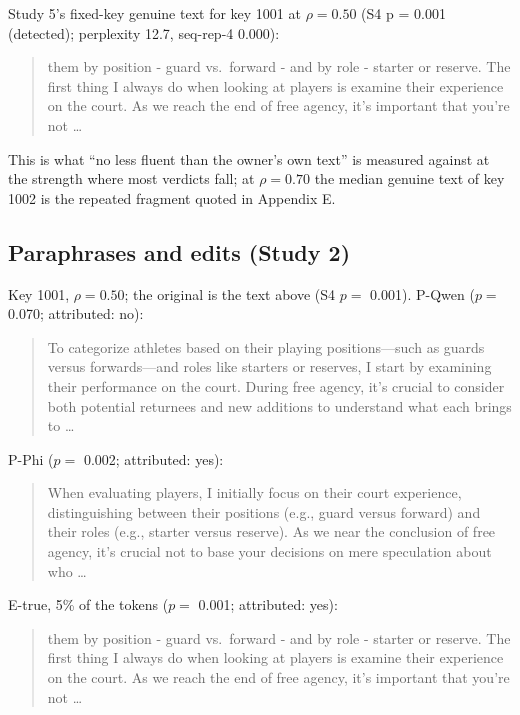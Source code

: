 \documentclass[11pt,letterpaper]{article}
\begin{document}
Study 5's fixed-key genuine text for key 1001 at \(\rho = 0.50\) (S4 p = 0.001 (detected); perplexity 12.7, seq-rep-4 0.000):

\begin{quote}
them by position - guard vs.~forward - and by role - starter or reserve. The first thing I always do when looking at players is examine their experience on the court. As we reach the end of free agency, it's important that you're not \ldots{}
\end{quote}

This is what ``no less fluent than the owner's own text'' is measured against at the strength where most verdicts fall; at \(\rho = 0.70\) the median genuine text of key 1002 is the repeated fragment quoted in Appendix E.

\hypertarget{paraphrases-and-edits-study-2}{%
\subsection{Paraphrases and edits (Study 2)}\label{paraphrases-and-edits-study-2}}

Key 1001, \(\rho = 0.50\); the original is the text above (S4 \(p =\) 0.001). P-Qwen (\(p =\) 0.070; attributed: no):

\begin{quote}
To categorize athletes based on their playing positions---such as guards versus forwards---and roles like starters or reserves, I start by examining their performance on the court. During free agency, it's crucial to consider both potential returnees and new additions to understand what each brings to \ldots{}
\end{quote}

P-Phi (\(p =\) 0.002; attributed: yes):

\begin{quote}
When evaluating players, I initially focus on their court experience, distinguishing between their positions (e.g., guard versus forward) and their roles (e.g., starter versus reserve). As we near the conclusion of free agency, it's crucial not to base your decisions on mere speculation about who \ldots{}
\end{quote}

E-true, 5\% of the tokens (\(p =\) 0.001; attributed: yes):

\begin{quote}
them by position - guard vs.~forward - and by role - starter or reserve. The first thing I always do when looking at players is examine their experience on the court. As we reach the end of free agency, it's important that you're not \ldots{}
\end{quote}
\end{document}
